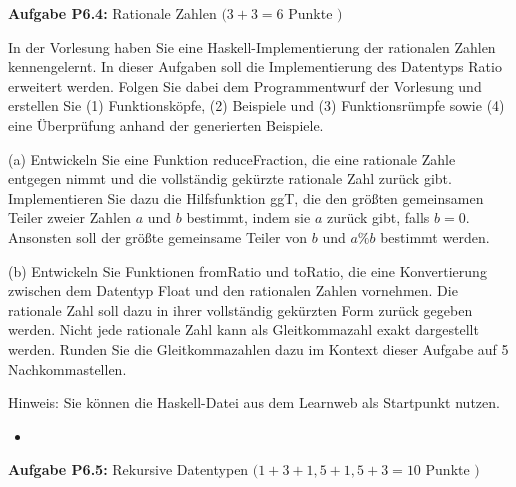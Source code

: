 \newpage

\textbf{Aufgabe P6.4:} Rationale Zahlen $(3+3=6$ Punkte $)$ 

In der Vorlesung haben Sie eine Haskell-Implementierung der rationalen Zahlen kennengelernt. In dieser Aufgaben soll die Implementierung des Datentyps Ratio erweitert werden. Folgen Sie dabei dem Programmentwurf der Vorlesung und erstellen Sie (1) Funktionsköpfe, (2) Beispiele und (3) Funktionsrümpfe sowie (4) eine Überprüfung anhand der generierten Beispiele.

(a) Entwickeln Sie eine Funktion reduceFraction, die eine rationale Zahle entgegen nimmt und die vollständig gekürzte rationale Zahl zurück gibt. Implementieren Sie dazu die Hilfsfunktion ggT, die den größten gemeinsamen Teiler zweier Zahlen $a$ und $b$ bestimmt, indem sie $a$ zurück gibt, falls $b=0$. Ansonsten soll der größte gemeinsame Teiler von $b$ und $a \% b$ bestimmt werden.

(b) Entwickeln Sie Funktionen fromRatio und toRatio, die eine Konvertierung zwischen dem Datentyp Float und den rationalen Zahlen vornehmen. Die rationale Zahl soll dazu in ihrer vollständig gekürzten Form zurück gegeben werden. Nicht jede rationale Zahl kann als Gleitkommazahl exakt dargestellt werden. Runden Sie die Gleitkommazahlen dazu im Kontext dieser Aufgabe auf 5 Nachkommastellen.

Hinweis: Sie können die Haskell-Datei aus dem Learnweb als Startpunkt nutzen.

\begin{itemize}
  \item []\inputminted{Haskell}{A6_4.hs}
\end{itemize}

\newpage

\textbf{ Aufgabe P6.5:} Rekursive Datentypen $(1+3+1,5+1,5+3=10$ Punkte $)$ 

